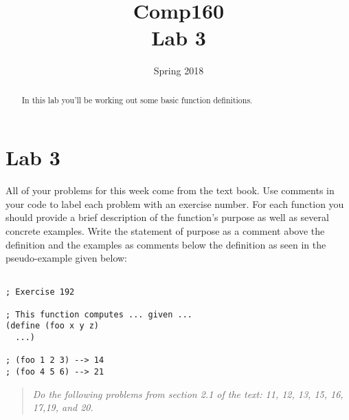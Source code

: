 \documentclass[nobib]{tufte-handout}
\title{Comp160 \\ Lab 3 }
\author{}
\date{ Spring 2018 }
\begin{document}
\maketitle

\begin{abstract}
In this lab you'll be working out some basic function definitions.
\end{abstract}

\section{Lab 3}

All of your problems for this week come from the text book. Use comments in your code to label each problem with an exercise number. For each function you should provide a brief description of the function's purpose as well as several concrete examples. Write the statement of purpose as a comment above the definition and the examples as comments below the definition as seen in the pseudo-example given below:

\begin{lstlisting}

; Exercise 192

; This function computes ... given ...
(define (foo x y z)
  ...)

; (foo 1 2 3) --> 14
; (foo 4 5 6) --> 21
\end{lstlisting}

\vspace{1in}

\begin{quote}
  \textit{
Do the following problems from section 2.1 of the text: 11, 12, 13, 15, 16, 17,19, and 20.
}
\end{quote}
\end{document}
